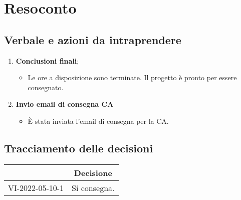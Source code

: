 \section{Resoconto}
\subsection{Verbale e azioni da intraprendere}

\begin{enumerate}
	\item \textbf{Conclusioni finali};
	\begin{itemize}
		\item Le ore a disposizione sono terminate. Il progetto è pronto per essere consegnato.
	\end{itemize}
	\item \textbf{Invio email di consegna CA}
	\begin{itemize}
		\item È stata inviata l'email di consegna per la CA.
	\end{itemize}
\end{enumerate}

\pagebreak

\subsection{Tracciamento delle decisioni}

\begin{table}[H]
	\centering
	\renewcommand{\arraystretch}{1.8}
	\begin{tabular}{c | p{10cm}}
		\rowcolor[HTML]{125E28}
		\multicolumn{1}{c}{\color[HTML]{FFFFFF} \textbf{ID}} &
		\multicolumn{1}{c}{\color[HTML]{FFFFFF} \textbf{Decisione}} \\
		\hline
		VI-2022-05-10-1 & Si consegna.\\ \hline
	\end{tabular}
\end{table}